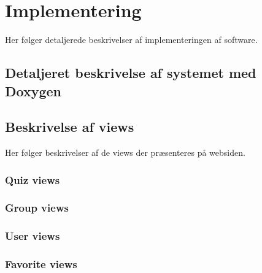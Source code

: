 \chapter{Implementering}

Her følger detaljerede beskrivelser af implementeringen af software.

\section{Detaljeret beskrivelse af systemet med Doxygen}


\section{Beskrivelse af views}\label{sec:views}
Her følger beskrivelser af de views der præsenteres på websiden.
\subsection{Quiz views}




\subsection{Group views}




\subsection{User views}


\subsection{Favorite views}


